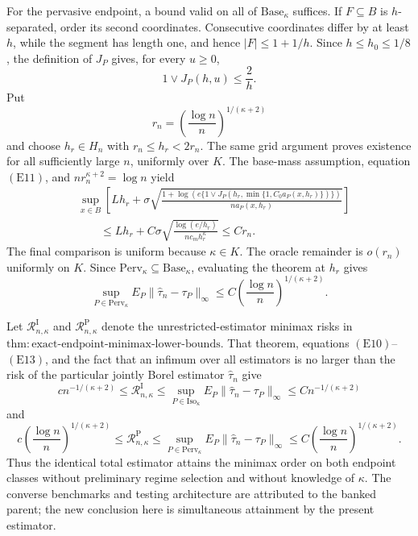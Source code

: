 For the pervasive endpoint, a bound valid on all of
\(\mathrm{Base}_\kappa\) suffices.  If \(F\subseteq B\) is
\(h\)-separated, order its second coordinates.  Consecutive coordinates differ by at least \(h\), while the segment has length one, and hence
\(|F|\leq1+1/h\).  Since \(h\leq h_0\leq1/8\), the definition of
\(J_P\) gives, for every \(u\geq0\),
\[
 1\vee J_P(h,u)\leq\frac2h.
 \tag{E11}
\]
Put
\[
 r_n=\left(\frac{\log n}{n}\right)^{1/(\kappa+2)}
\]
and choose \(h_r\in H_n\) with
\(r_n\leq h_r<2r_n\).  The same grid argument proves existence for all sufficiently large \(n\), uniformly over \(K\).  The base-mass assumption, equation \((\mathrm{E11})\), and
\(nr_n^{\kappa+2}=\log n\) yield
\[
\begin{aligned}
 &\sup_{x\in B}\left[
 Lh_r+\sigma\sqrt{
 \frac{1+\log\!\left(e\{1\vee
 J_P(h_r,\min\{1,C_0a_P(x,h_r)\})\}\right)}
 {n a_P(x,h_r)}}\right]\\
 &\qquad\leq Lh_r+C\sigma
 \sqrt{\frac{\log(e/h_r)}{nc_mh_r^\kappa}}
 \leq Cr_n.
\end{aligned}
 \tag{E12}
\]
The final comparison is uniform because \(\kappa\in K\).  The oracle remainder is \(o(r_n)\) uniformly on \(K\).  Since
\(\mathrm{Perv}_\kappa\subseteq\mathrm{Base}_\kappa\), evaluating the theorem at \(h_r\) gives
\[
 \sup_{P\in\mathrm{Perv}_\kappa}
 E_P\|\widehat\tau_n-\tau_P\|_\infty
 \leq C\left(\frac{\log n}{n}\right)^{1/(\kappa+2)}.
 \tag{E13}
\]

Let \(\mathcal R^{\mathrm I}_{n,\kappa}\) and
\(\mathcal R^{\mathrm P}_{n,\kappa}\) denote the unrestricted-estimator minimax risks in
\(\mathrm{thm{:}exact\text{-}endpoint\text{-}minimax\text{-}lower\text{-}bounds}\).  That theorem, equations \((\mathrm{E10})\)--\((\mathrm{E13})\), and the fact that an infimum over all estimators is no larger than the risk of the particular jointly Borel estimator \(\widehat\tau_n\) give
\[
 c n^{-1/(\kappa+2)}
 \leq\mathcal R^{\mathrm I}_{n,\kappa}
 \leq\sup_{P\in\mathrm{Iso}_\kappa}
 E_P\|\widehat\tau_n-\tau_P\|_\infty
 \leq C n^{-1/(\kappa+2)}
 \tag{E14}
\]
and
\[
 c\left(\frac{\log n}{n}\right)^{1/(\kappa+2)}
 \leq\mathcal R^{\mathrm P}_{n,\kappa}
 \leq\sup_{P\in\mathrm{Perv}_\kappa}
 E_P\|\widehat\tau_n-\tau_P\|_\infty
 \leq C\left(\frac{\log n}{n}\right)^{1/(\kappa+2)}.
 \tag{E15}
\]
Thus the identical total estimator attains the minimax order on both endpoint classes without preliminary regime selection and without knowledge of \(\kappa\).  The converse benchmarks and testing architecture are attributed to the banked parent; the new conclusion here is simultaneous attainment by the present estimator.
